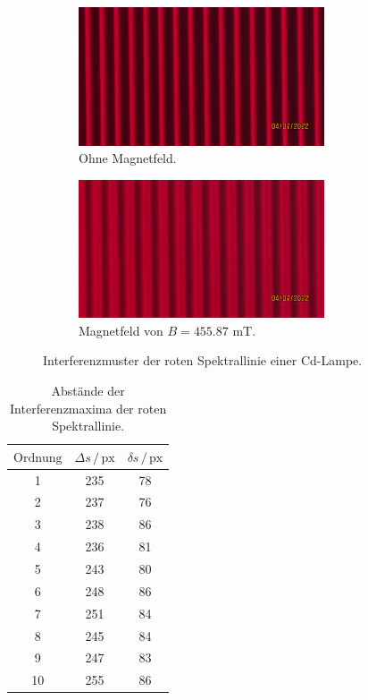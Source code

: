 \begin{figure}[H]
	\centering
	\begin{subfigure}[b]{0.8\textwidth}
		\centering
		\includegraphics[width=0.8\textwidth]{data/rot1.JPG}
		\caption{Ohne Magnetfeld.}
    \label{fig:rot1}
	\end{subfigure}
	
	\begin{subfigure}[b]{0.8\textwidth}
		\centering
		\includegraphics[width=0.8\textwidth]{data/rot1b.JPG}
		\caption{Magnetfeld von $B= 455.87$ mT.}
    \label{fig:rot1b}
	\end{subfigure}
    \caption{Interferenzmuster der roten Spektrallinie einer Cd-Lampe.}
\label{fig:rot}
\end{figure}


\begin{table}
    \centering
    \begin{tabular}{c c c}
    \toprule
    $\text{Ordnung}$ & $\Delta s \,/\, \text{px}$ & $\delta s \,/\, \text{px}$ \\
     \midrule 
     1 &  235 & 78 \\
     2 &  237 & 76\\
     3 &  238 & 86\\
     4 &  236 & 81\\
     5 &  243 & 80\\
     6 &  248 & 86\\
     7 &  251 & 84\\
     8 &  245 & 84\\
     9 &  247 & 83\\
     10 &  255 & 86\\
    \bottomrule
    \end{tabular}
    \caption{Abstände der Interferenzmaxima der roten Spektrallinie.}
    \label{tab:rot}
    \end{table}

